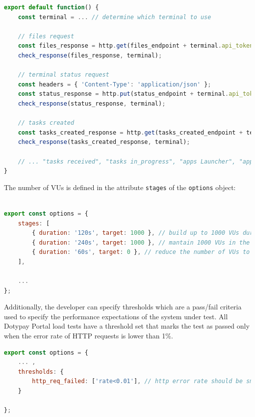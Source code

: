 \documentclass[12pt, a4paper]{article}
\begin{document}
\begin{lstlisting}[language=JavaScript, caption={Definition of first three HTTP requests calls in the Terminal synchronization benchmark scenario},captionpos=b]
export default function() {
    const terminal = ... // determine which terminal to use 

    // files request
    const files_response = http.get(files_endpoint + terminal.api_token);
    check_response(files_response, terminal);

    // terminal status request
    const headers = { 'Content-Type': 'application/json' };
    const status_response = http.put(status_endpoint + terminal.api_token, JSON.stringify(status_endpoint_body), { headers: headers });
    check_response(status_response, terminal);

    // tasks created
    const tasks_created_response = http.get(tasks_created_endpoint + terminal.api_token);
    check_response(tasks_created_response, terminal);

    // ... "tasks received", "tasks in_progress", "apps Launcher", "apps Mandatory" and "apps optional" HTTP requests
}
\end{lstlisting}

The number of VUs is defined in the attribute \texttt{stages} of the \texttt{options} object:

\begin{lstlisting}[language=JavaScript, caption={Definition of the number of VUs during a load test},captionpos=b]

export const options = {
    stages: [
        { duration: '120s', target: 1000 }, // build up to 1000 VUs during the first two minutes
        { duration: '240s', target: 1000 }, // mantain 1000 VUs in the next four minutes
        { duration: '60s', target: 0 }, // reduce the number of VUs to zero in the next minute and finish the test
    ],

    ...
};

\end{lstlisting}

Additionally, the developer can specify thresholds which are a pass/fail criteria used to specify the performance expectations of the system under test.
All Dotypay Portal load tests have a threshold set that marks the test as passed only when the error rate of HTTP requests is lower than 1\%.

\begin{lstlisting}[language=JavaScript, caption={Threshold configuration for created load tests},captionpos=b]
export const options = {
    ... ,
    thresholds: {
        http_req_failed: ['rate<0.01'], // http error rate should be smaller than 1%
    }
    
};
\end{lstlisting}
\end{document}
